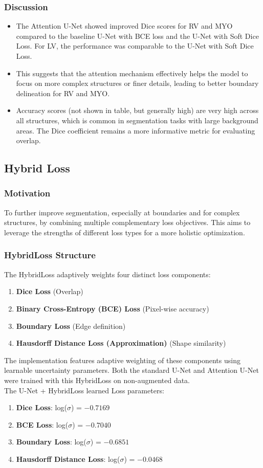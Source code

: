 \documentclass{article}
\begin{document}
\subsubsection{Discussion}
\begin{itemize}
  \item The Attention U-Net showed improved Dice scores for RV and MYO compared to the baseline U-Net with BCE loss and the U-Net with Soft Dice Loss. For LV, the performance was comparable to the U-Net with Soft Dice Loss.
  \item This suggests that the attention mechanism effectively helps the model to focus on more complex structures or finer details, leading to better boundary delineation for RV and MYO.
  \item Accuracy scores (not shown in table, but generally high) are very high across all structures, which is common in segmentation tasks with large background areas. The Dice coefficient remains a more informative metric for evaluating overlap.
\end{itemize}

\subsection{Hybrid Loss}
\subsubsection{Motivation}
To further improve segmentation, especially at boundaries and for complex structures, by combining multiple complementary loss objectives. This aims to leverage the strengths of different loss types for a more holistic optimization.

\subsubsection{HybridLoss Structure}
The HybridLoss adaptively weights four distinct loss components:
\begin{enumerate}
  \item \textbf{Dice Loss} (Overlap)
  \item \textbf{Binary Cross-Entropy (BCE) Loss} (Pixel-wise accuracy)
  \item \textbf{Boundary Loss} (Edge definition)
  \item \textbf{Hausdorff Distance Loss (Approximation)} (Shape similarity)
\end{enumerate}
The implementation features adaptive weighting of these components using learnable uncertainty parameters. Both the standard U-Net and Attention U-Net were trained with this HybridLoss on non-augmented data.
\\
The U-Net + HybridLoss learned Loss parameters:
\begin{enumerate}
  \item \textbf{Dice Loss}: log($\sigma$) = $-0.7169$
  \item \textbf{BCE Loss}: log($\sigma$) = $-0.7040$
  \item \textbf{Boundary Loss}: log($\sigma$) = $-0.6851$
  \item \textbf{Hausdorff Distance Loss}: log($\sigma$) = $-0.0468$
\end{enumerate}
\end{document}
